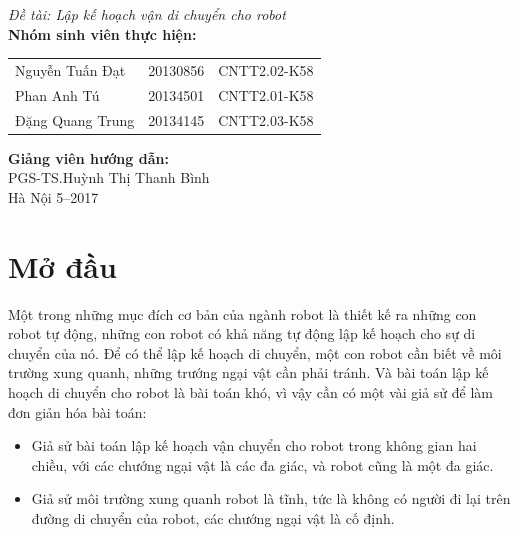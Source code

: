 \documentclass[a4paper,12pt]{report}
\renewcommand{\contentsname}{Mục lục}
\begin{document}
\begin{center}
{\fontsize{18}{20}\selectfont \emph{Đề tài: Lập kế hoạch vận di chuyển cho robot}}\\[2cm]
\hspace{-5cm}\fontsize{14}{16}\selectfont \textbf{Nhóm sinh viên thực hiện:}\\[0.1cm] 
\begin{longtable}{l c c}
Nguyễn Tuấn Đạt & 20130856 & CNTT2.02-K58 \\
Phan Anh Tú &   20134501 & CNTT2.01-K58\\
Đặng Quang Trung & 20134145 & CNTT2.03-K58 \\
\end{longtable}
\vspace{0.5cm}
\hspace{-6cm}\fontsize{14}{16}\selectfont \textbf{Giảng viên hướng dẫn:}\\[0.1cm]
\hspace{-2.7cm}\fontsize{14}{16}\selectfont PGS-TS.Huỳnh Thị Thanh Bình \\[3cm]
\fontsize{16}{19}\selectfont Hà Nội 5--2017
\end{center}
\newpage
\pdfbookmark{\contentsname}{toc}
\tableofcontents

\chapter{Mở đầu}
Một trong những mục đích cơ bản của ngành robot là thiết kế ra những con robot tự động, những con robot có khả năng tự động lập kế hoạch cho sự di chuyển của nó. Để có thể lập kế hoạch di chuyển, một con robot cần biết về môi trường xung quanh, những trướng ngại vật cần phải tránh. Và bài toán lập kế hoạch di chuyển cho robot là bài toán khó, vì vậy cần có một vài giả sử để làm đơn giản hóa bài toán: 
\begin{itemize}
\item Giả sử bài toán lập kế hoạch vận chuyển cho robot trong không gian hai chiều, với các chướng ngại vật là các đa giác, và robot cũng là một đa giác. 
\item Giả sử môi trường xung quanh robot là tĩnh, tức là không có người đi lại trên đường di chuyển của robot, các chướng ngại vật là cố định.
\end{itemize}
\end{document}

